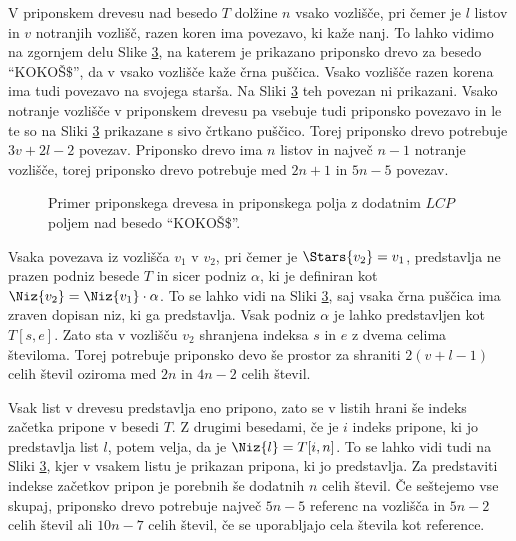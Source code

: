 V priponskem drevesu nad besedo $T$ dolžine $n$ vsako vozlišče, pri čemer je $l$ listov in $v$ notranjih vozlišč, razen koren ima povezavo, ki kaže nanj. To lahko vidimo na zgornjem delu Slike \ref{fig:SuffuxArray}, na katerem je prikazano priponsko drevo za besedo \enquote{KOKOŠ$\$$}, da v vsako vozlišče kaže črna puščica. Vsako vozlišče razen korena ima tudi povezavo na svojega starša. Na Sliki \ref{fig:SuffuxArray} teh povezan ni prikazani. Vsako notranje vozlišče v priponskem drevesu pa vsebuje tudi priponsko povezavo in le te so na Sliki \ref{fig:SuffuxArray} prikazane s sivo črtkano puščico. Torej priponsko drevo potrebuje $3v+2l-2$ povezav. Priponsko drevo ima $n$ listov in največ $n-1$ notranje vozlišče, torej priponsko drevo potrebuje med $2n+1$ in $5n -5$ povezav.

\begin{figure}[htb]
    \begin{subfigure}[t]{\linewidth}
        
        
        \centering
        \subcaption*{}
        \label{fig:bSADrevo}
    \end{subfigure}
    \begin{subfigure}[t]{1\linewidth}        
        
        \centering
        \subcaption*{}
        \label{fig:bSAPolje}
    \end{subfigure}
    \caption{Primer priponskega drevesa in priponskega polja z dodatnim $LCP$ poljem nad besedo \enquote{KOKOŠ\$}.} 
    \label{fig:SuffuxArray}
\end{figure}

Vsaka povezava iz vozlišča $v_1$ v $v_2$, pri čemer je $\Stars{v_2}=v_1$, predstavlja ne prazen podniz besede $T$ in sicer podniz $\alpha$, ki je definiran kot $\Niz{v_2}=\Niz{v_1}\cdot\alpha$. To se lahko vidi na Sliki \ref{fig:SuffuxArray}, saj vsaka črna puščica ima zraven dopisan niz, ki ga predstavlja. Vsak podniz $\alpha$ je lahko predstavljen kot $T[s,e]$. Zato sta v vozlišču $v_2$ shranjena indeksa $s$ in $e$ z dvema celima številoma. Torej potrebuje priponsko devo še prostor za shraniti $2(v+l-1)$ celih števil oziroma med $2n$ in $4n-2$ celih števil.

Vsak list v drevesu predstavlja eno pripono, zato se v listih hrani še indeks začetka pripone v besedi $T$. Z drugimi besedami, če je $i$ indeks pripone, ki jo predstavlja list $l$, potem velja, da je $\Niz{l}=T[i,n]$. To se lahko vidi tudi na Sliki \ref{fig:SuffuxArray}, kjer v vsakem listu je prikazan pripona, ki jo predstavlja. Za predstaviti indekse začetkov pripon je porebnih še dodatnih $n$ celih števil. Če seštejemo vse skupaj, priponsko drevo potrebuje največ $5n-5$ referenc na vozlišča in $5n-2$ celih števil ali $10n-7$ celih števil, če se uporabljajo cela števila kot reference.

